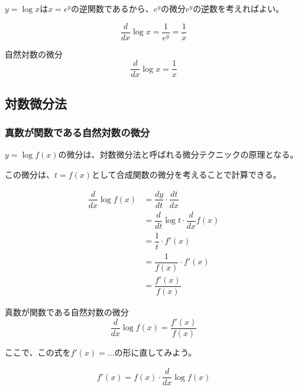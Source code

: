 \documentclass[../math-imaging]{subfiles}
\begin{document}
$y=\log x$は$x=e^y$の逆関数であるから、$e^y$の微分$e^y$の逆数を考えればよい。

\begin{equation}
  \dfrac{d}{dx}\log x = \dfrac{1}{e^y} = \dfrac{1}{x}
\end{equation}

\begin{theorem}{自然対数の微分}
  \LARGE
  \begin{equation}
    \dfrac{d}{dx}\log x = \dfrac{1}{x}
  \end{equation}
\end{theorem}

\subsection{対数微分法}

\subsubsection{真数が関数である自然対数の微分}

$y=\log f(x)$の微分は、対数微分法と呼ばれる微分テクニックの原理となる。

この微分は、$t=f(x)$として合成関数の微分を考えることで計算できる。

\begin{align}
  \dfrac{d}{dx}\log f(x) & = \dfrac{dy}{dt} \cdot \dfrac{dt}{dx}         \\
                         & = \dfrac{d}{dt}\log t \cdot \dfrac{d}{dx}f(x) \\
                         & = \dfrac{1}{t} \cdot f'(x)                    \\
                         & = \dfrac{1}{f(x)} \cdot f'(x)                 \\
                         & = \dfrac{f'(x)}{f(x)}
\end{align}

\begin{theorem}{真数が関数である自然対数の微分}
  \LARGE
  \begin{equation}
    \dfrac{d}{dx}\log f(x) = \dfrac{f'(x)}{f(x)}
  \end{equation}
\end{theorem}

ここで、この式を$f'(x) = \ldots$の形に直してみよう。

\begin{align}
  f'(x) = f(x) \cdot \dfrac{d}{dx}\log f(x)
\end{align}
\end{document}
